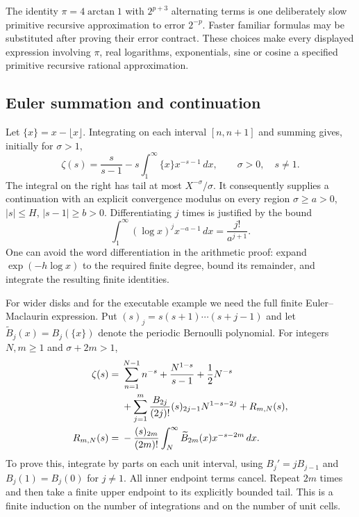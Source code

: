 The identity $\pi=4\arctan1$ with $2^{p+3}$ alternating terms is one
deliberately slow primitive recursive approximation to error $2^{-p}$.
Faster familiar formulas may be substituted after proving their error
contract. These choices make every displayed expression involving
$\pi$, real logarithms, exponentials, sine or cosine a specified
primitive recursive rational approximation.

\subsection{Euler summation and continuation}
Let $\{x\}=x-\lfloor x\rfloor$. Integrating on each interval
$[n,n+1]$ and summing gives, initially for $\sigma>1$,
\begin{equation}
 \zeta(s)=\frac{s}{s-1}
       -s\int_1^\infty\{x\}x^{-s-1}\,dx,
 \qquad \sigma>0,\quad s\ne1.
 \label{eq:euler-basic}
\end{equation}
The integral on the right has tail at most
$X^{-\sigma}/\sigma$. It consequently supplies a continuation with
an explicit convergence modulus on every region
$\sigma\ge a>0$, $|s|\le H$, $|s-1|\ge b>0$.
Differentiating $j$ times is justified by the bound
\begin{equation}
 \int_1^\infty(\log x)^j x^{-a-1}\,dx=\frac{j!}{a^{j+1}}.
 \label{eq:logmoments}
\end{equation}
One can avoid the word differentiation in the arithmetic proof:
expand $\exp(-h\log x)$ to the required finite degree, bound its
remainder, and integrate the resulting finite identities.

For wider disks and for the executable example we need the full finite
Euler--Maclaurin expression. Put
$(s)_j=s(s+1)\cdots(s+j-1)$ and let
$\widetilde B_j(x)=B_j(\{x\})$ denote the periodic Bernoulli polynomial.
For integers $N,m\ge1$ and $\sigma+2m>1$,
\begin{align}
 \zeta(s)={}&\sum_{n=1}^{N-1}n^{-s}
       +\frac{N^{1-s}}{s-1}+\frac12N^{-s}\notag\\
 &+\sum_{j=1}^m\frac{B_{2j}}{(2j)!}(s)_{2j-1}N^{1-s-2j}
       +R_{m,N}(s),\label{eq:em}\\
 R_{m,N}(s)={}&-\frac{(s)_{2m}}{(2m)!}
       \int_N^\infty\widetilde B_{2m}(x)x^{-s-2m}\,dx.
 \label{eq:em-remainder}
\end{align}
To prove this, integrate by parts on each unit interval, using
$B_j'=jB_{j-1}$ and $B_j(1)=B_j(0)$ for $j\ne1$. All inner endpoint
terms cancel. Repeat $2m$ times and then take a finite upper endpoint
to its explicitly bounded tail. This is a finite induction on the
number of integrations and on the number of unit cells.


